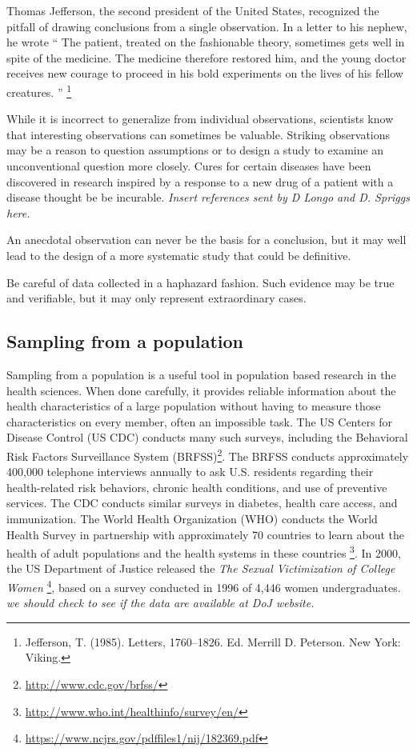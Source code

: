 \begin{doublespace}
Thomas Jefferson, the second president of the United States, recognized the pitfall of
drawing conclusions from a single observation. In a letter to his nephew, he wrote `` The
patient, treated on the fashionable theory, sometimes gets well in spite of the medicine.
The medicine therefore restored him, and the young doctor receives new courage to proceed
in his bold experiments on the lives of his fellow creatures. '' \footnote{Jefferson, T.
(1985). Letters, 1760–1826. Ed. Merrill D. Peterson. New York: Viking.}

While it is incorrect to generalize from individual observations, scientists know that interesting observations can sometimes be valuable.  Striking observations may be a reason to question assumptions or to design a study to examine an unconventional question more closely.  Cures for certain diseases have been discovered in research inspired by a response to a new drug of a patient with a disease thought be be incurable.  \textit{Insert references sent by D Longo and D. Spriggs here.}  

An anecdotal observation can never be the basis for a conclusion, but it may well lead to the design of a more systematic study that could be definitive.

\begin{termBox}{
Be careful of data collected in a haphazard fashion. Such evidence may be true and verifiable, but it may only represent extraordinary cases.}
\end{termBox}



\subsection{Sampling from a population}

Sampling from a population is a useful tool in population based research in the health sciences.  When done carefully, it provides reliable information about the health characteristics of a large population without having to measure those characteristics on every member, often an impossible task.  The US Centers for Disease Control (US CDC) conducts many such surveys, including the Behavioral Risk Factors Surveillance System (BRFSS)\footnote{\url{ http://www.cdc.gov/brfss/}}.  The BRFSS conducts approximately 400,000 telephone interviews annually to ask U.S. residents regarding their health-related risk behaviors, chronic health conditions, and use of preventive services.  The CDC conducts similar surveys in diabetes, health care access, and immunization.  The World Health Organization (WHO) conducts the World Health Survey in partnership  with approximately 70 countries to learn about the health of adult populations and the health systems in these countries \footnote{\url{http://www.who.int/healthinfo/survey/en/}}.  In 2000, the US Department of Justice released the \textit{The Sexual Victimization of College Women} \footnote{\url{https://www.ncjrs.gov/pdffiles1/nij/182369.pdf}}, based on a survey conducted in 1996 of 4,446 women undergraduates.  \textit{we should check to see if the data are available at DoJ website.}




\end{doublespace}
